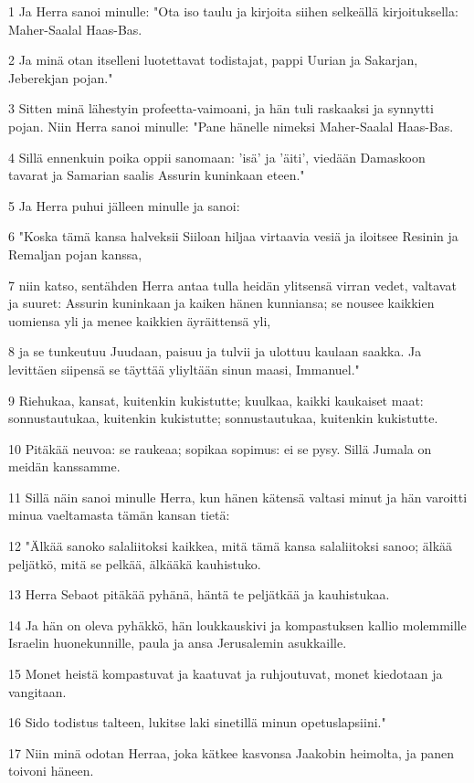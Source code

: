 \par 1 Ja Herra sanoi minulle: "Ota iso taulu ja kirjoita siihen selkeällä kirjoituksella: Maher-Saalal Haas-Bas.
\par 2 Ja minä otan itselleni luotettavat todistajat, pappi Uurian ja Sakarjan, Jeberekjan pojan."
\par 3 Sitten minä lähestyin profeetta-vaimoani, ja hän tuli raskaaksi ja synnytti pojan. Niin Herra sanoi minulle: "Pane hänelle nimeksi Maher-Saalal Haas-Bas.
\par 4 Sillä ennenkuin poika oppii sanomaan: 'isä' ja 'äiti', viedään Damaskoon tavarat ja Samarian saalis Assurin kuninkaan eteen."
\par 5 Ja Herra puhui jälleen minulle ja sanoi:
\par 6 "Koska tämä kansa halveksii Siiloan hiljaa virtaavia vesiä ja iloitsee Resinin ja Remaljan pojan kanssa,
\par 7 niin katso, sentähden Herra antaa tulla heidän ylitsensä virran vedet, valtavat ja suuret: Assurin kuninkaan ja kaiken hänen kunniansa; se nousee kaikkien uomiensa yli ja menee kaikkien äyräittensä yli,
\par 8 ja se tunkeutuu Juudaan, paisuu ja tulvii ja ulottuu kaulaan saakka. Ja levittäen siipensä se täyttää yliyltään sinun maasi, Immanuel."
\par 9 Riehukaa, kansat, kuitenkin kukistutte; kuulkaa, kaikki kaukaiset maat: sonnustautukaa, kuitenkin kukistutte; sonnustautukaa, kuitenkin kukistutte.
\par 10 Pitäkää neuvoa: se raukeaa; sopikaa sopimus: ei se pysy. Sillä Jumala on meidän kanssamme.
\par 11 Sillä näin sanoi minulle Herra, kun hänen kätensä valtasi minut ja hän varoitti minua vaeltamasta tämän kansan tietä:
\par 12 "Älkää sanoko salaliitoksi kaikkea, mitä tämä kansa salaliitoksi sanoo; älkää peljätkö, mitä se pelkää, älkääkä kauhistuko.
\par 13 Herra Sebaot pitäkää pyhänä, häntä te peljätkää ja kauhistukaa.
\par 14 Ja hän on oleva pyhäkkö, hän loukkauskivi ja kompastuksen kallio molemmille Israelin huonekunnille, paula ja ansa Jerusalemin asukkaille.
\par 15 Monet heistä kompastuvat ja kaatuvat ja ruhjoutuvat, monet kiedotaan ja vangitaan.
\par 16 Sido todistus talteen, lukitse laki sinetillä minun opetuslapsiini."
\par 17 Niin minä odotan Herraa, joka kätkee kasvonsa Jaakobin heimolta, ja panen toivoni häneen.
